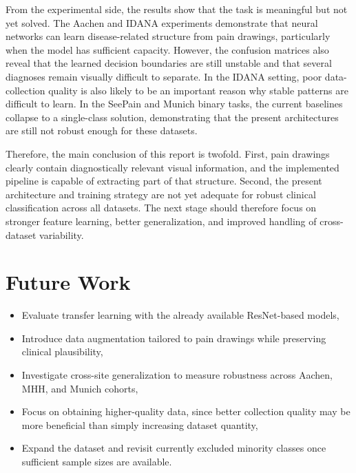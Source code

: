 \documentclass[12pt]{report}
\begin{document}
From the experimental side, the results show that the task is meaningful but not yet solved. The Aachen and IDANA experiments demonstrate that neural networks can learn disease-related structure from pain drawings, particularly when the model has sufficient capacity. However, the confusion matrices also reveal that the learned decision boundaries are still unstable and that several diagnoses remain visually difficult to separate. In the IDANA setting, poor data-collection quality is also likely to be an important reason why stable patterns are difficult to learn. In the SeePain and Munich binary tasks, the current baselines collapse to a single-class solution, demonstrating that the present architectures are still not robust enough for these datasets.

Therefore, the main conclusion of this report is twofold. First, pain drawings clearly contain diagnostically relevant visual information, and the implemented pipeline is capable of extracting part of that structure. Second, the present architecture and training strategy are not yet adequate for robust clinical classification across all datasets. The next stage should therefore focus on stronger feature learning, better generalization, and improved handling of cross-dataset variability.

\chapter{Future Work}

\begin{itemize}
    \item Evaluate transfer learning with the already available ResNet-based models,
    \item Introduce data augmentation tailored to pain drawings while preserving clinical plausibility,
    \item Investigate cross-site generalization to measure robustness across Aachen, MHH, and Munich cohorts,
    \item Focus on obtaining higher-quality data, since better collection quality may be more beneficial than simply increasing dataset quantity,
    \item Expand the dataset and revisit currently excluded minority classes once sufficient sample sizes are available.
\end{itemize}
\end{document}
